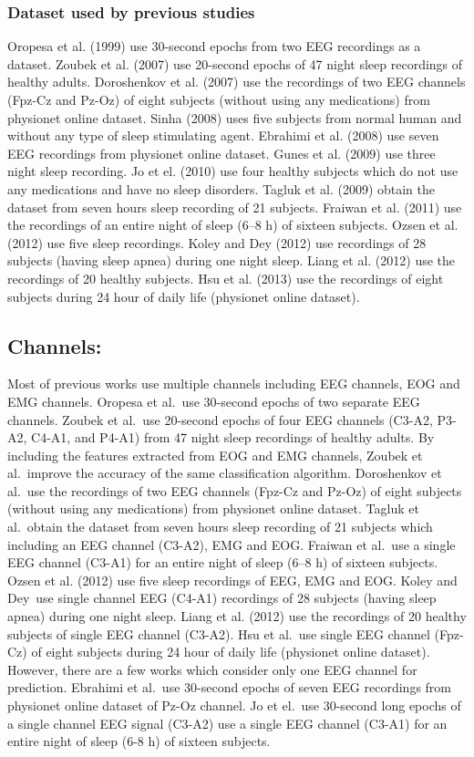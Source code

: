 \documentclass[12pt,letterpaper]{article}
\begin{document}
\subsubsection*{Dataset used by previous studies}
Oropesa et al. (1999) use 30-second epochs from two EEG recordings as a dataset. Zoubek et al. (2007) use 20-second epochs of 47 night sleep recordings of healthy adults. Doroshenkov et al. (2007) use the recordings of two EEG channels (Fpz-Cz and Pz-Oz) of eight subjects (without using any medications) from physionet online dataset. Sinha (2008) uses five subjects from normal human and without any type of sleep stimulating agent. Ebrahimi et al. (2008) use seven EEG recordings from physionet online dataset. Gunes et al. (2009) use three night sleep recording. Jo et el. (2010) use four healthy subjects which do not use any medications and have no sleep disorders. Tagluk et al. (2009) obtain the dataset from seven hours sleep recording of 21 subjects. Fraiwan et al. (2011) use the recordings of an entire night of sleep (6–8 h) of sixteen subjects. Ozsen et al. (2012) use five sleep recordings. Koley and Dey (2012) use recordings of 28 subjects (having sleep apnea) during one night sleep. Liang et al. (2012) use the recordings of 20 healthy subjects. Hsu et al. (2013) use the recordings of eight subjects during 24 hour of daily life (physionet online dataset). 
\subsection*{ Channels:} 

Most of previous works use multiple channels including EEG channels, EOG and EMG channels. Oropesa et al.\ use 30-second epochs of two separate EEG channels. Zoubek et al.\ use 20-second epochs of four EEG channels (C3-A2, P3-A2, C4-A1, and P4-A1) from 47 night sleep recordings of healthy adults. By including the features extracted from EOG and EMG channels, Zoubek et al.\ improve the accuracy of the same classification algorithm. Doroshenkov et al.\ use the recordings of two EEG channels (Fpz-Cz and Pz-Oz) of eight subjects (without using any medications) from physionet online dataset. Tagluk et al.\ obtain the dataset from seven hours sleep recording of 21 subjects which including an EEG channel (C3-A2), EMG and EOG. Fraiwan et al.\ use a single EEG channel (C3-A1) for an entire night of sleep (6–8 h) of sixteen subjects. Ozsen et al. (2012) use five sleep recordings of EEG, EMG and EOG. Koley and Dey\ use single channel EEG (C4-A1) recordings of 28 subjects (having sleep apnea) during one night sleep. Liang et al. (2012) use the recordings of 20 healthy subjects of single EEG channel (C3-A2). Hsu et al.\ use single EEG channel (Fpz-Cz) of eight subjects during 24 hour of daily life (physionet online dataset). However, there are a few works which consider only one EEG channel for prediction. Ebrahimi et al.\ use 30-second epochs of seven EEG recordings from physionet online dataset of Pz-Oz channel. Jo et el.\ use 30-second long epochs of a single channel EEG signal (C3-A2) use a single EEG channel (C3-A1) for an entire night of sleep (6-8 h) of sixteen subjects.
\end{document}
